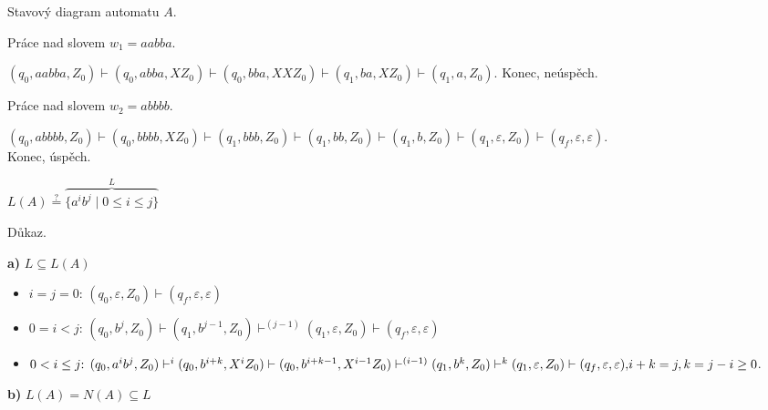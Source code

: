 \begin{multicols}{2}
    Stavový diagram automatu $A$.


\columnbreak

    Práce nad slovem $w_1 = aabba$.

    $(q_0, aabba, Z_0) \vdash (q_0, abba, X Z_0) \vdash (q_0, bba, XXZ_0) \vdash (q_1, ba, X Z_0) \vdash (q_1, a, Z_0)$. 
    Konec, neúspěch.

    Práce nad slovem $w_2 = abbbb$.

    $(q_0, abbbb, Z_0) \vdash (q_0, bbbb, X Z_0) \vdash (q_1, bbb, Z_0) \vdash (q_1, bb, Z_0) \vdash (q_1, b, Z_0)
    \vdash (q_1, \varepsilon, Z_0) \vdash (q_f, \varepsilon, \varepsilon)$. \\Konec, úspěch.
\end{multicols}
$L(A) \stackrel{?}{=} \overbrace{\{a^i b^j \mid 0 \leq i \leq j\}}^L$

Důkaz.

\textbf{a)} $L \subseteq L(A)$
\begin{itemize}[leftmargin=*]
    \item $i=j=0 \text{: } (q_0, \varepsilon, Z_0) \vdash (q_f, \varepsilon, \varepsilon)$
    \item $0=i < j \text{: } (q_0, b^j, Z_0) \vdash (q_1, b^{j-1}, Z_0) \vdash^{(j-1)} (q_1, \varepsilon, Z_0) 
    \vdash (q_f, \varepsilon, \varepsilon)$
    \item ${0<i \leq j \text{: } (q_0, a^i b^j, Z_0) \vdash^i (q_0, b^{i+k}, X^i Z_0) \vdash (q_0, b^{i+k-1}, X^{i-1} Z_0)
    \vdash^{(i-1)} (q_1, b^k, Z_0) \vdash^k (q_1, \varepsilon, Z_0) \vdash (q_f, \varepsilon, \varepsilon),}\\
    i+k = j, k=j-i \geq 0$.
\end{itemize}
\textbf{b)} $L(A) = N(A) \subseteq L$


